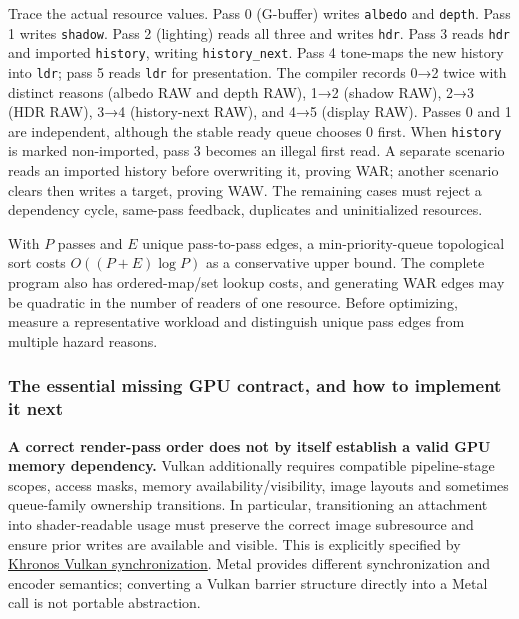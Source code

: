 Trace the actual resource values. Pass 0 (G-buffer) writes \texttt{albedo} and \texttt{depth}. Pass 1 writes \texttt{shadow}. Pass 2 (lighting) reads all three and writes \texttt{hdr}. Pass 3 reads \texttt{hdr} and imported \texttt{history}, writing \texttt{history\_next}. Pass 4 tone-maps the new history into \texttt{ldr}; pass 5 reads \texttt{ldr} for presentation. The compiler records 0→2 twice with distinct reasons (albedo RAW and depth RAW), 1→2 (shadow RAW), 2→3 (HDR RAW), 3→4 (history-next RAW), and 4→5 (display RAW). Passes 0 and 1 are independent, although the stable ready queue chooses 0 first. When \texttt{history} is marked non-imported, pass 3 becomes an illegal first read. A separate scenario reads an imported history before overwriting it, proving WAR; another scenario clears then writes a target, proving WAW. The remaining cases must reject a dependency cycle, same-pass feedback, duplicates and uninitialized resources.

With \(P\) passes and \(E\) unique pass-to-pass edges, a min-priority-queue topological sort costs \(O((P+E)\log P)\) as a conservative upper bound. The complete program also has ordered-map/set lookup costs, and generating WAR edges may be quadratic in the number of readers of one resource. Before optimizing, measure a representative workload and distinguish unique pass edges from multiple hazard reasons.

\subsubsection{The essential missing GPU contract, and how to implement it next}\label{06-engine-ii-ch042-the-essential-missing-gpu-contract-and-how-to-implement-it-next}

\hypertarget{06-engine-ii-ch042-the-essential-missing-gpu-contract-and-how-to-implement-it-next}{}

\textbf{A correct render-pass order does not by itself establish a valid GPU memory dependency.} Vulkan additionally requires compatible pipeline-stage scopes, access masks, memory availability/visibility, image layouts and sometimes queue-family ownership transitions. In particular, transitioning an attachment into shader-readable usage must preserve the correct image subresource and ensure prior writes are available and visible. This is explicitly specified by \href{https://docs.vulkan.org/spec/latest/chapters/synchronization.html}{Khronos Vulkan synchronization}. Metal provides different synchronization and encoder semantics; converting a Vulkan barrier structure directly into a Metal call is not portable abstraction.


